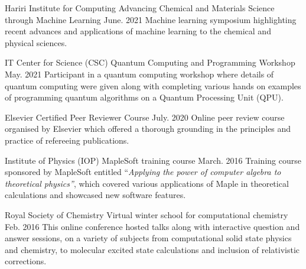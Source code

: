 


\begin{cventries}


\cvtransfer
{Hariri Institute for Computing} 
{Advancing Chemical and Materials Science through Machine Learning} %
{June. 2021} %
{}
{Machine learning symposium highlighting recent advances and applications of machine learning to the chemical and physical sciences.
}


\cvtransfer
{IT Center for Science (CSC)} 
{Quantum Computing and Programming Workshop} %
{May. 2021} %
{}
{Participant in a quantum computing workshop where details of quantum computing were given along with completing various hands on examples of programming quantum algorithms on a Quantum Processing Unit (QPU).
}


\cvtransfer
{Elsevier} 
{Certified Peer Reviewer Course} %
{July. 2020} %
{}
{Online peer review course organised by Elsevier which offered a thorough grounding in the principles and practice of refereeing publications.
}


\cvtransfer
{Institute of Physics (IOP)} 
{MapleSoft training course} %
{March. 2016} %
{}
{Training course sponsored by MapleSoft entitled ``\textit{Applying the power of computer algebra to theoretical physics''}, which covered various applications of Maple in theoretical calculations and showcased new software features.
}


\cventry
{Royal Society of Chemistry}
{Virtual winter school for computational chemistry} %
{Feb. 2016} %
{}
{This online conference hosted talks along with interactive question and answer sessions, on a variety of subjects from computational solid state physics and chemistry, to molecular excited state calculations and inclusion of relativistic corrections.
}


\end{cventries}
